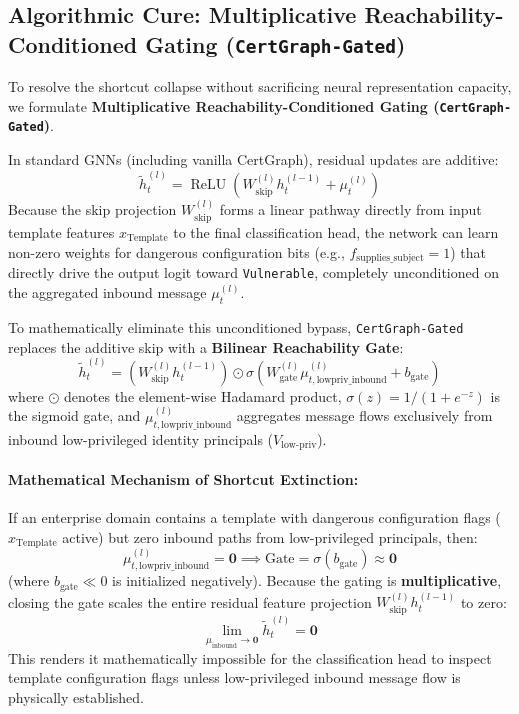 \subsection{Algorithmic Cure: Multiplicative Reachability-Conditioned Gating (\texttt{CertGraph-Gated})}
\label{subsec:gated_shortcut_cure}
To resolve the shortcut collapse without sacrificing neural representation capacity, we formulate \textbf{Multiplicative Reachability-Conditioned Gating (\texttt{CertGraph-Gated})}.

In standard GNNs (including vanilla CertGraph), residual updates are additive:
\begin{equation}
\tilde{h}_t^{(l)} = \operatorname{ReLU}\left(W_{\text{skip}}^{(l)} h_t^{(l-1)} + \mu_t^{(l)}\right)
\end{equation}
Because the skip projection $W_{\text{skip}}^{(l)}$ forms a linear pathway directly from input template features $x_{\text{Template}}$ to the final classification head, the network can learn non-zero weights for dangerous configuration bits (e.g., $f_{\text{supplies\_subject}} = 1$) that directly drive the output logit toward \texttt{Vulnerable}, completely unconditioned on the aggregated inbound message $\mu_t^{(l)}$.

To mathematically eliminate this unconditioned bypass, \texttt{CertGraph-Gated} replaces the additive skip with a \textbf{Bilinear Reachability Gate}:
\begin{equation}
\tilde{h}_t^{(l)} = \left(W_{\text{skip}}^{(l)} h_t^{(l-1)}\right) \odot \sigma\left(W_{\text{gate}}^{(l)} \mu_{t,\text{lowpriv\_inbound}}^{(l)} + b_{\text{gate}}\right)
\end{equation}
where $\odot$ denotes the element-wise Hadamard product, $\sigma(z) = 1 / (1 + e^{-z})$ is the sigmoid gate, and $\mu_{t,\text{lowpriv\_inbound}}^{(l)}$ aggregates message flows exclusively from inbound low-privileged identity principals ($V_{\text{low-priv}}$).

\paragraph{Mathematical Mechanism of Shortcut Extinction:}
If an enterprise domain contains a template with dangerous configuration flags ($x_{\text{Template}}$ active) but zero inbound paths from low-privileged principals, then:
\begin{equation}
\mu_{t,\text{lowpriv\_inbound}}^{(l)} = \mathbf{0} \implies \text{Gate} = \sigma(b_{\text{gate}}) \approx \mathbf{0}
\end{equation}
(where $b_{\text{gate}} \ll 0$ is initialized negatively). Because the gating is \textbf{multiplicative}, closing the gate scales the entire residual feature projection $W_{\text{skip}}^{(l)} h_t^{(l-1)}$ to zero:
\begin{equation}
\lim_{\mu_{\text{inbound}} \to \mathbf{0}} \tilde{h}_t^{(l)} = \mathbf{0}
\end{equation}
This renders it mathematically impossible for the classification head to inspect template configuration flags unless low-privileged inbound message flow is physically established.

